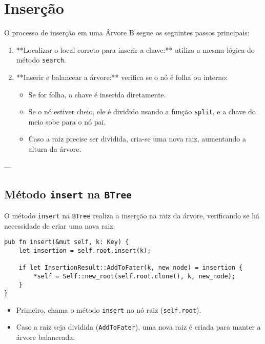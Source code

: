 \section{Inserção}

O processo de inserção em uma Árvore B segue os seguintes passos principais:

\begin{enumerate}
    \item **Localizar o local correto para inserir a chave:** utiliza a mesma lógica do método \texttt{search}.
    \item **Inserir e balancear a árvore:** verifica se o nó é folha ou interno:
    \begin{itemize}
        \item Se for folha, a chave é inserida diretamente.
        \item Se o nó estiver cheio, ele é dividido usando a função \texttt{split}, e a chave do meio sobe para o nó pai.
        \item Caso a raiz precise ser dividida, cria-se uma nova raiz, aumentando a altura da árvore.
    \end{itemize}
\end{enumerate}

---

\subsection{Método \texttt{insert} na \texttt{BTree}}

O método \texttt{insert} na \texttt{BTree} realiza a inserção na raiz da árvore, verificando se há necessidade de criar uma nova raiz.

\begin{lstlisting}
pub fn insert(&mut self, k: Key) {
    let insertion = self.root.insert(k);

    if let InsertionResult::AddToFater(k, new_node) = insertion {
        *self = Self::new_root(self.root.clone(), k, new_node);
    }
}
\end{lstlisting}

\begin{itemize}
    \item Primeiro, chama o método \texttt{insert} no nó raiz (\texttt{self.root}).
    \item Caso a raiz seja dividida (\texttt{AddToFater}), uma nova raiz é criada para manter a árvore balanceada.
\end{itemize}

